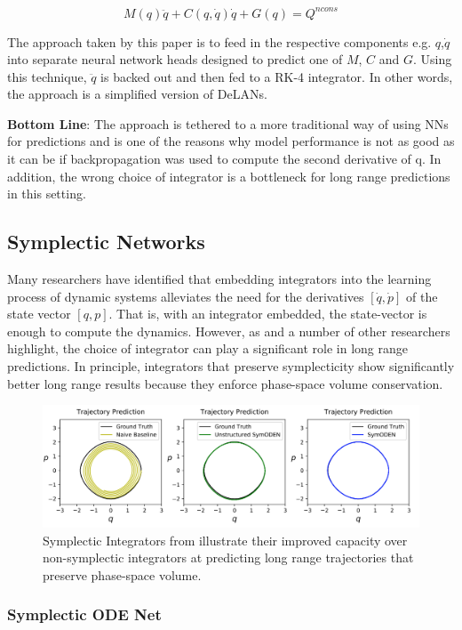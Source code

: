 \documentclass{article}
\begin{document}
$$ M(q) \ddot{q} + C(q,\dot{q})\dot{q} + G(q) = Q^{ncons} $$

The approach taken by this paper is to feed in the respective components e.g. $q$,$\dot{q}$ into separate neural network heads designed to predict one of $M$, $C$ and $G$. Using this technique, $\ddot{q}$ is backed out and then fed to a RK-4 integrator. In other words, the approach is a simplified version of DeLANs.

\textbf{Bottom Line}: The approach is tethered to a more traditional way of using NNs for predictions and is one of the reasons why model performance is not as good as it can be if backpropagation was used to compute the second derivative of q. In addition, the wrong choice of integrator is a bottleneck for long range predictions in this setting.

\subsection{Symplectic Networks}

Many researchers have identified that embedding integrators into the learning process of dynamic systems alleviates the need for the derivatives $[\dot{q},\dot{p}]$ of the state vector $[q,p]$. That is, with an integrator embedded, the state-vector is enough to compute the dynamics. However, as \cite{zhu_deep_2020} and a number of other researchers highlight, the choice of integrator can play a significant role in long range predictions. In principle, integrators that preserve symplecticity show significantly better long range results because they enforce phase-space volume conservation.

\begin{figure}
\centering
\includegraphics[width=\textwidth]{figures/4sympnet.png}
\caption{Symplectic Integrators from \cite{zhong_symplectic_2019} illustrate their improved capacity over non-symplectic integrators at predicting long range trajectories that preserve phase-space volume.}
\end{figure}

\subsubsection{Symplectic ODE Net}
\end{document}
